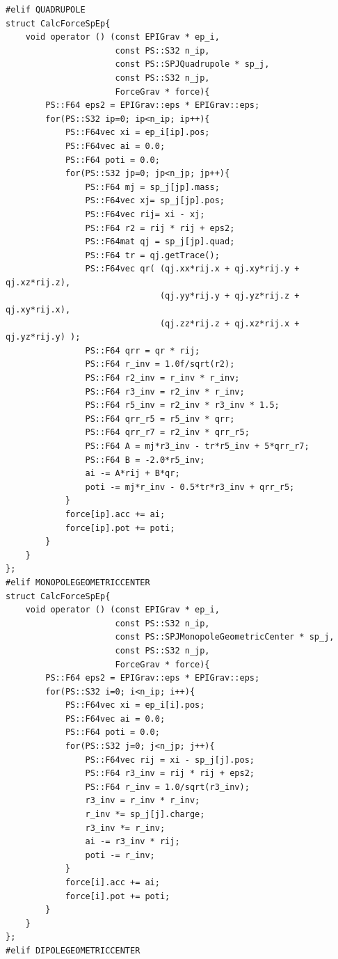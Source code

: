 \begin{lstlisting}[caption=重力$N$体計算]
#elif QUADRUPOLE
struct CalcForceSpEp{
    void operator () (const EPIGrav * ep_i,
                      const PS::S32 n_ip,
                      const PS::SPJQuadrupole * sp_j,
                      const PS::S32 n_jp,
                      ForceGrav * force){
        PS::F64 eps2 = EPIGrav::eps * EPIGrav::eps;
        for(PS::S32 ip=0; ip<n_ip; ip++){
            PS::F64vec xi = ep_i[ip].pos;
            PS::F64vec ai = 0.0;
            PS::F64 poti = 0.0;
            for(PS::S32 jp=0; jp<n_jp; jp++){
                PS::F64 mj = sp_j[jp].mass;
                PS::F64vec xj= sp_j[jp].pos;
                PS::F64vec rij= xi - xj;
                PS::F64 r2 = rij * rij + eps2;
                PS::F64mat qj = sp_j[jp].quad;
                PS::F64 tr = qj.getTrace();
                PS::F64vec qr( (qj.xx*rij.x + qj.xy*rij.y + qj.xz*rij.z),
                               (qj.yy*rij.y + qj.yz*rij.z + qj.xy*rij.x),
                               (qj.zz*rij.z + qj.xz*rij.x + qj.yz*rij.y) );
                PS::F64 qrr = qr * rij;
                PS::F64 r_inv = 1.0f/sqrt(r2);
                PS::F64 r2_inv = r_inv * r_inv;
                PS::F64 r3_inv = r2_inv * r_inv;
                PS::F64 r5_inv = r2_inv * r3_inv * 1.5;
                PS::F64 qrr_r5 = r5_inv * qrr;
                PS::F64 qrr_r7 = r2_inv * qrr_r5;
                PS::F64 A = mj*r3_inv - tr*r5_inv + 5*qrr_r7;
                PS::F64 B = -2.0*r5_inv;
                ai -= A*rij + B*qr;
                poti -= mj*r_inv - 0.5*tr*r3_inv + qrr_r5;
            }
            force[ip].acc += ai;
            force[ip].pot += poti;
        }
    }
};
#elif MONOPOLEGEOMETRICCENTER
struct CalcForceSpEp{
    void operator () (const EPIGrav * ep_i,
                      const PS::S32 n_ip,
                      const PS::SPJMonopoleGeometricCenter * sp_j,
                      const PS::S32 n_jp,
                      ForceGrav * force){
        PS::F64 eps2 = EPIGrav::eps * EPIGrav::eps;
        for(PS::S32 i=0; i<n_ip; i++){
            PS::F64vec xi = ep_i[i].pos;
            PS::F64vec ai = 0.0;
            PS::F64 poti = 0.0;
            for(PS::S32 j=0; j<n_jp; j++){
                PS::F64vec rij = xi - sp_j[j].pos;
                PS::F64 r3_inv = rij * rij + eps2;
                PS::F64 r_inv = 1.0/sqrt(r3_inv);
                r3_inv = r_inv * r_inv;
                r_inv *= sp_j[j].charge;
                r3_inv *= r_inv;
                ai -= r3_inv * rij;
                poti -= r_inv;
            }
            force[i].acc += ai;
            force[i].pot += poti;
        }
    }
};
#elif DIPOLEGEOMETRICCENTER

\end{lstlisting}
